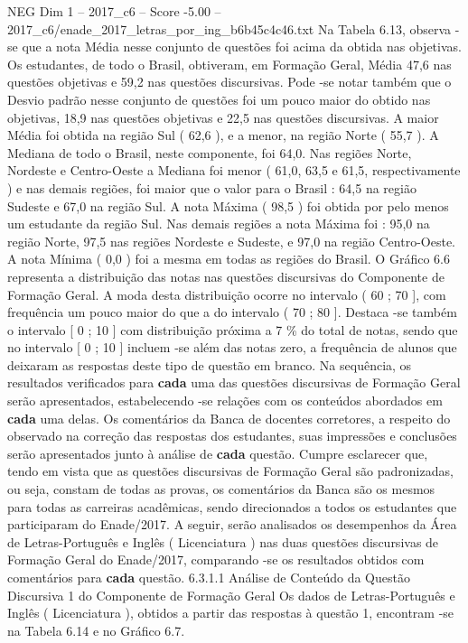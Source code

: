 \begin{textsample}{NEG Dim 1 – 2017\_c6 – Score -5.00 – 2017\_c6/enade\_2017\_letras\_por\_ing\_b6b45c4c46.txt}
Na Tabela 6.13, observa -se que a nota Média nesse conjunto de questões foi acima da obtida nas objetivas.
Os estudantes, de todo o Brasil, obtiveram, em Formação Geral, Média 47,6 nas questões objetivas e 59,2 nas questões discursivas.
Pode -se notar também que o Desvio padrão nesse conjunto de questões foi um pouco maior do obtido nas objetivas, 18,9 nas questões objetivas e 22,5 nas questões discursivas.
A maior Média foi obtida na região Sul ( 62,6 ), e a menor, na região Norte ( 55,7 ).
A Mediana de todo o Brasil, neste componente, foi 64,0.
Nas regiões Norte, Nordeste e Centro-Oeste a Mediana foi menor ( 61,0, 63,5 e 61,5, respectivamente ) e nas demais regiões, foi maior que o valor para o Brasil : 64,5 na região Sudeste e 67,0 na região Sul.
A nota Máxima ( 98,5 ) foi obtida por pelo menos um estudante da região Sul.
Nas demais regiões a nota Máxima foi : 95,0 na região Norte, 97,5 nas regiões Nordeste e Sudeste, e 97,0 na região Centro-Oeste.
A nota Mínima ( 0,0 ) foi a mesma em todas as regiões do Brasil.
O Gráfico 6.6 representa a distribuição das notas nas questões discursivas do Componente de Formação Geral.
A moda desta distribuição ocorre no intervalo ( 60 ; 70 ], com frequência um pouco maior do que a do intervalo ( 70 ; 80 ].
Destaca -se também o intervalo [ 0 ; 10 ] com distribuição próxima a 7 \% do total de notas, sendo que no intervalo [ 0 ; 10 ] incluem -se além das notas zero, a frequência de alunos que deixaram as respostas deste tipo de questão em branco.
Na sequência, os resultados verificados para \textbf{cada} uma das questões discursivas de Formação Geral serão apresentados, estabelecendo -se relações com os conteúdos abordados em \textbf{cada} uma delas.
Os comentários da Banca de docentes corretores, a respeito do observado na correção das respostas dos estudantes, suas impressões e conclusões serão apresentados junto à análise de \textbf{cada} questão.
Cumpre esclarecer que, tendo em vista que as questões discursivas de Formação Geral são padronizadas, ou seja, constam de todas as provas, os comentários da Banca são os mesmos para todas as carreiras acadêmicas, sendo direcionados a todos os estudantes que participaram do Enade/2017.
A seguir, serão analisados os desempenhos da Área de Letras-Português e Inglês ( Licenciatura ) nas duas questões discursivas de Formação Geral do Enade/2017, comparando -se os resultados obtidos com comentários para \textbf{cada} questão. 6.3.1.1 Análise de Conteúdo da Questão Discursiva 1 do Componente de Formação Geral Os dados de Letras-Português e Inglês ( Licenciatura ), obtidos a partir das respostas à questão 1, encontram -se na Tabela 6.14 e no Gráfico 6.7.

\end{textsample}
